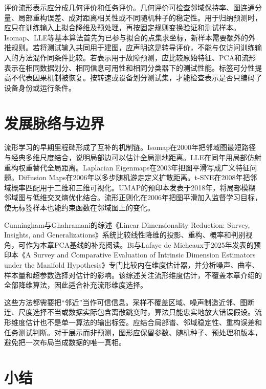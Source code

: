 评价流形表示应分成几何评价和任务评价。几何评价可检查邻域保持率、图连通分量、局部重构误差、成对距离相关性或不同随机种子的稳定性。用于归纳预测时，应只在训练输入上拟合降维及预处理，再按固定规则变换验证和测试样本。Isomap、LLE等基本算法首先为已参与拟合的点集求坐标，新样本需要额外的外推规则。若将测试输入共同用于建图，应声明这是转导评价，不能与仅访问训练输入的方法混作同条件比较。若表示用于故障预测，应比较原始特征、PCA和流形表示在相同数据划分、相同信息可用性和相同分类器下的测试性能。标签可分性提高不代表因果机制被恢复。按转速或设备划分测试集，才能检查表示是否只编码了设备身份或运行条件。

\section{发展脉络与边界}

流形学习的早期里程碑形成了互补的机制链。Isomap在2000年把邻域图最短路径与经典多维尺度结合，说明局部边可以估计全局测地距离\cite{tenenbaum2000isomap}。LLE在同年用局部仿射重构权重替代全局距离\cite{roweis2000lle}。Laplacian Eigenmaps在2003年把图平滑写成广义特征问题\cite{belkin2003laplacian}。Diffusion Maps在2006年以多步随机游走定义扩散距离\cite{coifman2006diffusion}。t-SNE在2008年把邻域概率匹配用于二维和三维可视化\cite{vandermaaten2008tsne}。UMAP的预印本发表于2018年，将局部模糊邻域图与低维交叉熵优化结合\cite{mcinnes2018umap}。流形正则化在2006年把图平滑加入监督学习目标，使无标签样本也能约束函数在邻域图上的变化\cite{belkin2006regularization}。

Cunningham与Ghahramani的综述《Linear Dimensionality Reduction: Survey, Insights, and Generalizations》系统比较线性降维的投影、重构、概率和判别视角，可作为本章PCA基线的补充阅读\cite{cunningham2015linear}。Bi与Lafaye de Micheaux于2025年发表的预印本《A Survey and Comparative Evaluation of Intrinsic Dimension Estimators under the Manifold Hypothesis》专门比较内在维度估计器，并分析噪声、曲率、样本量和超参数选择对估计的影响\cite{bi2025intrinsic}。该综述关注流形维度估计，不覆盖本章介绍的全部降维算法，因此适合补充流形维度选择。

这些方法都需要把“邻近”当作可信信息。采样不覆盖区域、噪声制造近邻、图断连、尺度选择不当或数据实际包含离散跳变时，算法只能忠实地放大错误假设。流形维度估计也不是单一算法的输出标签。应结合局部谱、邻域稳定性、重构误差和任务测试判断。对于展示而非预测，图形应保留参数、随机种子、预处理和版本，避免把一次布局当成数据的唯一真相。

\section{小结}

